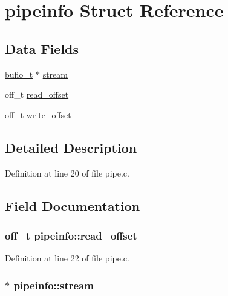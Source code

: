 \hypertarget{structpipeinfo}{\section{pipeinfo Struct Reference}
\label{structpipeinfo}
}
\subsection*{Data Fields}
\begin{DoxyCompactItemize}
\item 
\hyperlink{bufio_8h_aed33c7684664724ce2d39fe264246e35}{bufio\+\_\+t} $\ast$ \hyperlink{structpipeinfo_add2e1b264654f589da8c98cd502c3fbc}{stream}
\item 
off\+\_\+t \hyperlink{structpipeinfo_a88940cfea171abbf28b2b96bc87054ca}{read\+\_\+offset}
\item 
off\+\_\+t \hyperlink{structpipeinfo_abb510c9ed7b4d0bc60432bcc04e3962b}{write\+\_\+offset}
\end{DoxyCompactItemize}


\subsection{Detailed Description}


Definition at line 20 of file pipe.\+c.



\subsection{Field Documentation}
\hypertarget{structpipeinfo_a88940cfea171abbf28b2b96bc87054ca}{
\subsubsection[{read\+\_\+offset}]{\setlength{\rightskip}{0pt plus 5cm}off\+\_\+t pipeinfo\+::read\+\_\+offset}}\label{structpipeinfo_a88940cfea171abbf28b2b96bc87054ca}


Definition at line 22 of file pipe.\+c.

\hypertarget{structpipeinfo_add2e1b264654f589da8c98cd502c3fbc}{
\subsubsection[{stream}]{$\ast$ pipeinfo\+::stream}}\label{structpipeinfo_add2e1b264654f589da8c98cd502c3fbc}



